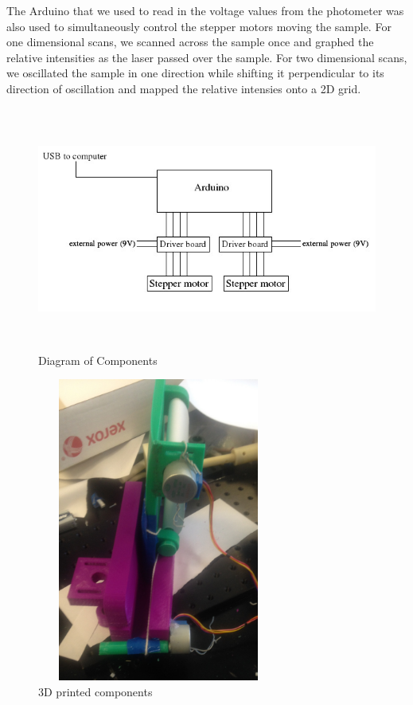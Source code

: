 \documentclass[letterpaper, 12pt]{article}
\begin{document}
\par
The Arduino that we used to read in the voltage values from the photometer was also used to simultaneously control the stepper motors moving the sample. For one dimensional scans, we scanned across the sample once and graphed the relative intensities as the laser passed over the sample. For two dimensional scans, we oscillated the sample in one direction while shifting it perpendicular to its direction of oscillation and mapped the relative intensies onto a 2D grid.

\begin{figure}[H]
  \centering
  \includegraphics[width=12cm,height=8cm]{setup_diagram}
  \caption{Diagram of Components}
\end{figure}

\newpage

\begin{figure}[H]
  \centering
  \includegraphics[width=8cm,height=10cm]{setup_picture}
  \caption[caption]{3D printed components\footnotemark}
\end{figure}
\end{document}
